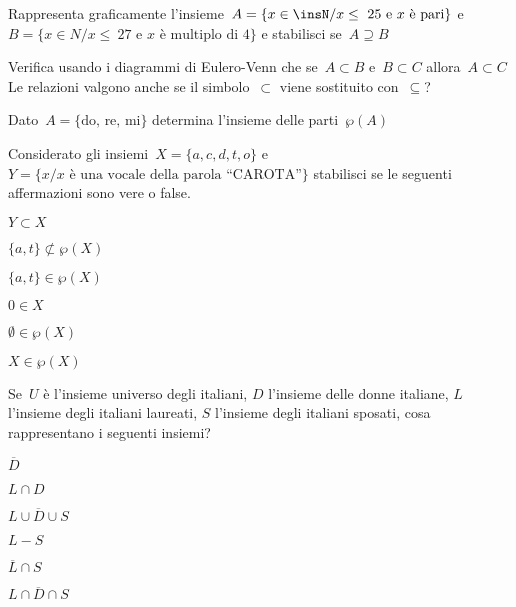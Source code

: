 \begin{esercizio}
\label{ese:7.68}
Rappresenta graficamente l'insieme~$A=\{x\in \insN/x\le~25 \text{ e } x\text{ è 
pari}\}$ e
$B=\{x\in N/x\le~27\text{ e } x\text{ è multiplo di~4}\}$ e stabilisci 
se~$A\supseteq B$
\end{esercizio}

\begin{esercizio}
\label{ese:7.69}
Verifica usando i diagrammi di Eulero-Venn che se~$A\subset B$ e~$B\subset C$ 
allora~$A\subset C$ Le relazioni valgono
anche se il simbolo~${\subset}$ viene sostituito con~${\subseteq}$?
\end{esercizio}

\begin{esercizio}
\label{ese:7.70}
Dato~$A=\{\text{do, re, mi}\}$ determina l'insieme delle parti~$\wp (A)$
\end{esercizio}

\begin{esercizio}
\label{ese:7.71}
Considerato gli insiemi~$X=\{a,c,d,t,o\}$ e 
$Y=\{x/x\text{ è una vocale della parola ``CAROTA''}\}$
stabilisci se le seguenti affermazioni sono vere o false.

\TabPositions{8cm}
\begin{multicols}{3}
\begin{enumeratea}
\item $Y \subset X$ \hfill \boxV\quad\boxF
\item $\{a,t\}\not\subset \wp (X)$ \hfill \boxV\quad\boxF
\item $\{a,t\}\in \wp (X)$ \hfill \boxV\quad\boxF
\item $0\in X$ \hfill \boxV\quad\boxF
\item $\emptyset \in \wp (X)$ \hfill \boxV\quad\boxF
\item $X\in \wp (X)$ \hfill \boxV\quad\boxF
\end{enumeratea}
\end{multicols}
\end{esercizio}

\begin{esercizio}
\label{ese:7.72}
Se~$U$ è l'insieme universo degli italiani, $D$ l'insieme delle donne italiane,
$L$ l'insieme degli italiani laureati, $S$ l'insieme degli italiani sposati, 
cosa rappresentano
i seguenti insiemi?
\begin{multicols}{3}
\begin{enumeratea}
\item $\overline{D}$
\item $L\cap D$
\item $\overline{{L\cup D\cup S}}$
\item $L-S$
\item $\overline{{L}}\cap S$
\item $\overline{{L\cap D\cap S}}$
\end{enumeratea}
\end{multicols}
\end{esercizio}

